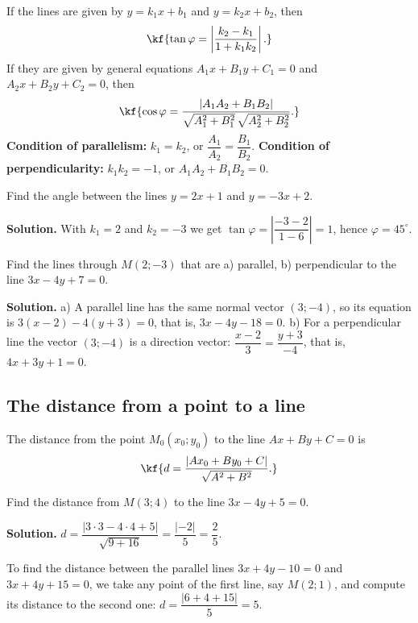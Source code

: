 If the lines are given by $y=k_1x+b_1$ and $y=k_2x+b_2$, then
\[\kf{\tan\varphi=\left|\frac{k_2-k_1}{1+k_1k_2}\right| .}\]
If they are given by general equations $A_1x+B_1y+C_1=0$ and
$A_2x+B_2y+C_2=0$, then
\[\kf{\cos\varphi=\frac{|A_1A_2+B_1B_2|}{\sqrt{A_1^2+B_1^2}\,\sqrt{A_2^2+B_2^2}}.}\]
\textbf{Condition of parallelism:} $k_1=k_2$, or $\dfrac{A_1}{A_2}=\dfrac{B_1}{B_2}$.
\quad \textbf{Condition of perpendicularity:} $k_1k_2=-1$, or $A_1A_2+B_1B_2=0$.

\begin{misol}
Find the angle between the lines $y=2x+1$ and $y=-3x+2$.

\textbf{Solution.} With $k_1=2$ and $k_2=-3$ we get
$\tan\varphi=\left|\dfrac{-3-2}{1-6}\right|=1$, hence $\varphi=45^\circ$.
\end{misol}

\begin{misol}
Find the lines through $M(2;-3)$ that are a) parallel, b) perpendicular to
the line $3x-4y+7=0$.

\textbf{Solution.} a) A parallel line has the same normal vector $(3;-4)$,
so its equation is $3(x-2)-4(y+3)=0$, that is, $3x-4y-18=0$.
b) For a perpendicular line the vector $(3;-4)$ is a direction vector:
$\dfrac{x-2}{3}=\dfrac{y+3}{-4}$, that is, $4x+3y+1=0$.
\end{misol}

\subsection{The distance from a point to a line}

\begin{teorema}
The distance from the point $M_0(x_0;y_0)$ to the line $Ax+By+C=0$ is
\[\kf{d=\frac{|Ax_0+By_0+C|}{\sqrt{A^2+B^2}} .}\]
\end{teorema}

\begin{misol}
Find the distance from $M(3;4)$ to the line $3x-4y+5=0$.

\textbf{Solution.} $d=\dfrac{|3\cdot3-4\cdot4+5|}{\sqrt{9+16}}=\dfrac{|-2|}{5}=\dfrac25$.
\end{misol}

\begin{misol}
To find the distance between the parallel lines $3x+4y-10=0$ and
$3x+4y+15=0$, we take any point of the first line, say $M(2;1)$, and
compute its distance to the second one:
$d=\dfrac{|6+4+15|}{5}=5$.
\end{misol}

